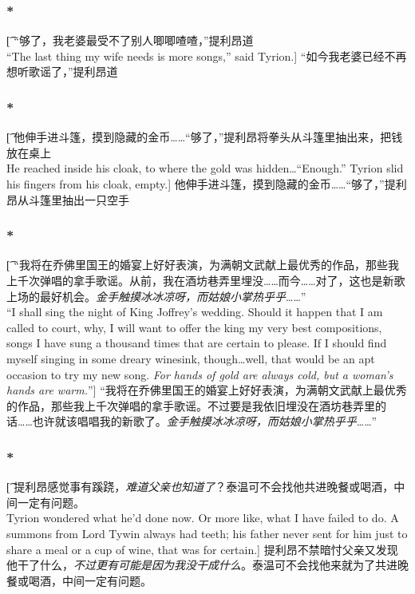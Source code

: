 \documentclass[12pt,a4paper]{article}
\begin{document}
\subsubsection{\color{red}*}\t[
	“够了，我老婆最受不了别人唧唧喳喳，”提利昂道\\
	“The last thing my wife needs is more songs,” said Tyrion.]
	“如今我老婆已经不再想听歌谣了，”提利昂道
	
\subsubsection{\color{red}*}\t[
	他伸手进斗篷，摸到隐藏的金币……“够了，”提利昂将拳头从斗篷里抽出来，把钱放在桌上\\
	He reached inside his cloak, to where the gold was hidden\ldots “Enough.” Tyrion slid his fingers from his cloak, empty.]
	他伸手进斗篷，摸到隐藏的金币……“够了，”提利昂从斗篷里抽出一只空手
	
\subsubsection{\color{red}*}\t[
	 “我将在乔佛里国王的婚宴上好好表演，为满朝文武献上最优秀的作品，那些我上千次弹唱的拿手歌谣。从前，我在酒坊巷弄里埋没……而今……对了，这也是新歌上场的最好机会。\emph{金手触摸冰冰凉呀，而姑娘小掌热乎乎}……” \\
	 “I shall sing the night of King Joffrey's wedding. Should it happen that I am called to court, why, I will want to offer the king my very best compositions, songs I have sung a thousand times that are certain to please. If I should find myself singing in some dreary winesink, though\ldots well, that would be an apt occasion to try my new song. \emph{For hands of gold are always cold, but a woman's hands are warm.}”]
	 “我将在乔佛里国王的婚宴上好好表演，为满朝文武献上最优秀的作品，那些我上千次弹唱的拿手歌谣。不过要是我依旧埋没在酒坊巷弄里的话……也许就该唱唱我的新歌了。\emph{金手触摸冰冰凉呀，而姑娘小掌热乎乎}……” 
	 
\subsubsection{\color{red}*}\t[
	提利昂感觉事有蹊跷，\emph{难道父亲也知道了}？泰温可不会找他共进晚餐或喝酒，中间一定有问题。\\
	Tyrion wondered what he'd done now. Or more like, what I have failed to do. A summons from Lord Tywin always had teeth; his father never sent for him just to share a meal or a cup of wine, that was for certain.]
	提利昂不禁暗忖父亲又发现他干了什么，\emph{不过更有可能是因为我没干成什么}。泰温可不会找他来就为了共进晚餐或喝酒，中间一定有问题。
	
\end{document}
